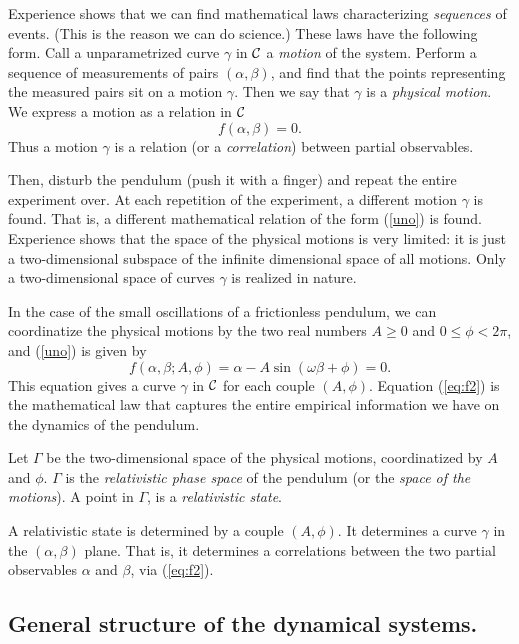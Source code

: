 \documentclass[10pt,nofootinbib]{revtex4}
\begin{document}
Experience shows that we can find mathematical laws characterizing {\em
sequences} of events.  (This is the reason we can do science.)  These
laws have the following form.  Call a unparametrized curve $\gamma$ in
$\cal C$ a {\em motion\/} of the system.  Perform a sequence of
measurements of pairs $(\alpha,\beta)$, and find that the points
representing the measured pairs sit on a motion $\gamma$.  Then we say
that $\gamma$ is a {\em physical motion\/}.   We express
a motion as a relation in $\cal C$
\begin{equation}
    f(\alpha,\beta)=0.
\label{uno}
\end{equation}
Thus a motion $\gamma$ is a relation (or a {\em correlation})
between partial observables.

Then, disturb the pendulum (push it with a finger) and repeat the
entire experiment over.  At each repetition of the experiment, a
different motion $\gamma$ is found.  That is, a different mathematical
relation of the form (\ref{uno}) is found.  Experience shows that the
space of the physical motions is very limited: it is 
 just a
two-dimensional subspace of the infinite dimensional space of all motions.  
Only a two-dimensional space of curves $\gamma$ is realized in nature.

In the case of the small oscillations of a frictionless pendulum, we can
coordinatize the physical motions by the two real numbers $A\ge 0$ and
$0\le\phi<2\pi$, and (\ref{uno}) is given by
\begin{equation}
    f(\alpha,\beta;A,\phi)=\alpha - A\sin(\omega \beta+\phi) =0.
    \label{eq:f2}
\end{equation}
This equation gives a curve $\gamma$ in $\cal C$ for each couple $(A,\phi)$.
Equation (\ref{eq:f2}) is the mathematical law that captures the entire
empirical information we have on the dynamics of the pendulum.  

Let $\Gamma$ be the two-dimensional space of the physical motions,
coordinatized by $A$ and $\phi$.  $\Gamma$ is the {\em relativistic
phase space\/} of the pendulum (or the
{\em space of the motions\/}).  A point in $\Gamma$, is a
{\em relativistic state}. 

A relativistic state is determined by a couple $(A,\phi)$.  It
determines a curve $\gamma$ in the $(\alpha,\beta)$ plane.  That is, it
determines a correlations between the two partial observables $\alpha$
and $\beta$, via (\ref{eq:f2}). 

\subsection{General structure of the dynamical
systems.}\label{genstr}
\end{document}
